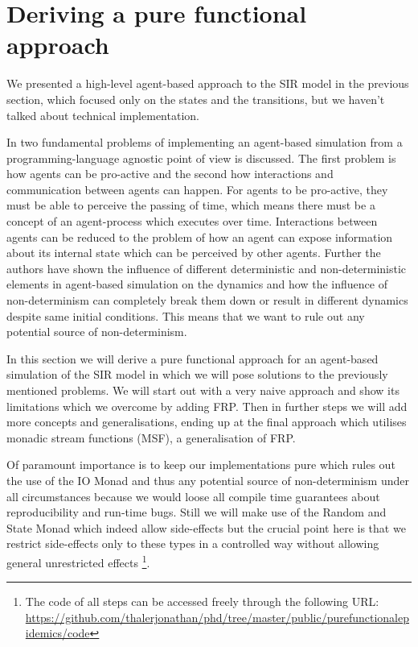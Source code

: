 \section{Deriving a pure functional approach}
\label{sec:functional_approach}

We presented a high-level agent-based approach to the SIR model in the previous section, which focused only on the states and the transitions, but we haven't talked about technical implementation. 

In \cite{thaler_art_2017} two fundamental problems of implementing an agent-based simulation from a programming-language agnostic point of view is discussed. The first problem is how agents can be pro-active and the second how interactions and communication between agents can happen. For agents to be pro-active, they must be able to perceive the passing of time, which means there must be a concept of an agent-process which executes over time. Interactions between agents can be reduced to the problem of how an agent can expose information about its internal state which can be perceived by other agents. Further the authors have shown the influence of different deterministic and non-deterministic elements in agent-based simulation on the dynamics and how the influence of non-determinism can completely break them down or result in different dynamics despite same initial conditions. This means that we want to rule out any potential source of non-determinism.

In this section we will derive a pure functional approach for an agent-based simulation of the SIR model in which we will pose solutions to the previously mentioned problems. We will start out with a very naive approach and show its limitations which we overcome by adding FRP. Then in further steps we will add more concepts and generalisations, ending up at the final approach which utilises monadic stream functions (MSF), a generalisation of FRP. 

Of paramount importance is to keep our implementations pure which rules out the use of the IO Monad and thus any potential source of non-determinism under all circumstances because we would loose all compile time guarantees about reproducibility and run-time bugs. Still we will make use of the Random and State Monad which indeed allow side-effects but the crucial point here is that we restrict side-effects only to these types in a controlled way without allowing general unrestricted effects
\footnote{The code of all steps can be accessed freely through the following URL: \url{https://github.com/thalerjonathan/phd/tree/master/public/purefunctionalepidemics/code}}.


